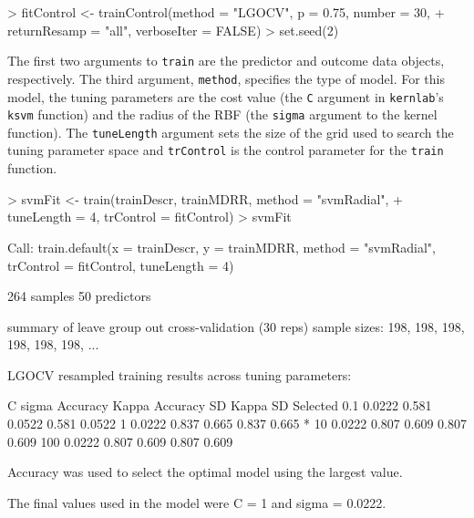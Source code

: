 \documentclass[12pt]{article}
\begin{document}
\begin{small}
\begin{Schunk}
\begin{Sinput}
> fitControl <- trainControl(method = "LGOCV", p = 0.75, number = 30, 
+     returnResamp = "all", verboseIter = FALSE)
> set.seed(2)
\end{Sinput}
\end{Schunk}
\end{small}


The first two arguments to \texttt{train} are the predictor and outcome data objects, respectively. The third argument, \texttt{method}, specifies the type of model. For this model, the tuning parameters are the cost value (the \texttt{C} argument in \texttt{kernlab}'s \texttt{ksvm} function) and the radius of the RBF (the \texttt{sigma} argument to the kernel function). The \texttt{tuneLength} argument sets the size of the grid used to search the tuning parameter space and \texttt{trControl} is the control parameter for the \texttt{train} function. 

\begin{small}
\begin{Schunk}
\begin{Sinput}
> svmFit <- train(trainDescr, trainMDRR, method = "svmRadial", 
+     tuneLength = 4, trControl = fitControl)
> svmFit
\end{Sinput}
\begin{Soutput}
Call:
train.default(x = trainDescr, y = trainMDRR, method = "svmRadial", 
    trControl = fitControl, tuneLength = 4)

264 samples
50 predictors

summary of leave group out cross-validation (30 reps) sample sizes:
    198, 198, 198, 198, 198, 198, ... 

LGOCV resampled training results across tuning parameters:

  C    sigma   Accuracy  Kappa   Accuracy SD  Kappa SD  Selected
  0.1  0.0222  0.581     0.0522  0.581        0.0522            
  1    0.0222  0.837     0.665   0.837        0.665     *       
  10   0.0222  0.807     0.609   0.807        0.609             
  100  0.0222  0.807     0.609   0.807        0.609             

Accuracy was used to select the optimal model using the largest value.

The final values used in the model were C = 1 and sigma = 0.0222.
\end{Soutput}
\end{Schunk}
\end{small}
\end{document}
